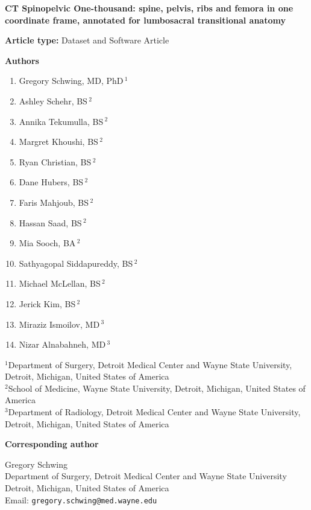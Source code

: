 \documentclass[12pt]{article}
\begin{document}
\begin{center}
{\large\bfseries CT Spinopelvic One-thousand: spine, pelvis, ribs and femora in one coordinate frame,
annotated for lumbosacral transitional anatomy}
\end{center}

\vspace{1em}
\noindent\textbf{Article type:} Dataset and Software Article

\vspace{1em}
\noindent\textbf{Authors}

\begin{enumerate}\itemsep0pt
\item Gregory Schwing, MD, PhD\,$^{1}$
\item Ashley Schehr, BS\,$^{2}$
\item Annika Tekumulla, BS\,$^{2}$
\item Margret Khoushi, BS\,$^{2}$
\item Ryan Christian, BS\,$^{2}$
\item Dane Hubers, BS\,$^{2}$
\item Faris Mahjoub, BS\,$^{2}$
\item Hassan Saad, BS\,$^{2}$
\item Mia Sooch, BA\,$^{2}$
\item Sathyagopal Siddapureddy, BS\,$^{2}$
\item Michael McLellan, BS\,$^{2}$
\item Jerick Kim, BS\,$^{2}$
\item Miraziz Ismoilov, MD\,$^{3}$
\item Nizar Alnabahneh, MD\,$^{3}$
\end{enumerate}

\noindent $^{1}$Department of Surgery, Detroit Medical Center and Wayne State University,
Detroit, Michigan, United States of America\\
$^{2}$School of Medicine, Wayne State University, Detroit, Michigan, United States of America\\
$^{3}$Department of Radiology, Detroit Medical Center and Wayne State University, Detroit,
Michigan, United States of America

\vspace{1em}
\noindent\textbf{Corresponding author}

\noindent Gregory Schwing\\
Department of Surgery, Detroit Medical Center and Wayne State University\\
Detroit, Michigan, United States of America\\
Email: \texttt{gregory.schwing@med.wayne.edu}
\end{document}
